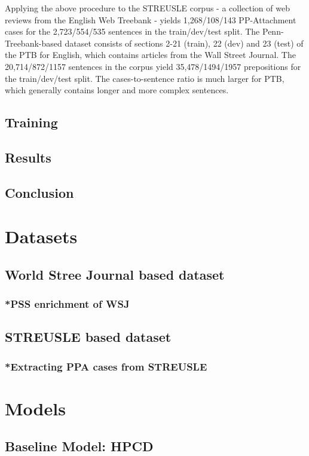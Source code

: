 Applying the above procedure to the STREUSLE corpus - a collection of web reviews from the English Web Treebank - yields 1,268/108/143 PP-Attachment cases for the 2,723/554/535 sentences in the train/dev/test split. The Penn-Treebank-based dataset consists of sections 2-21 (train), 22 (dev) and 23 (test) of the PTB for English, which contains articles from the Wall Street Journal. The 20,714/872/1157 sentences in the corpus yield 35,478/1494/1957 prepositions for the train/dev/test split. The cases-to-sentence ratio is much larger for PTB, which generally contains longer and more complex sentences. 

\subsection{Training}
\subsection{Results}
\subsection{Conclusion}
\pagebreak

\section{Datasets}
\subsection{World Stree Journal based dataset}
\subsubsection{*PSS enrichment of WSJ}
\subsection{STREUSLE based dataset}
\subsubsection{*Extracting PPA cases from STREUSLE}

\section{Models}
\subsection{Baseline Model: HPCD}
